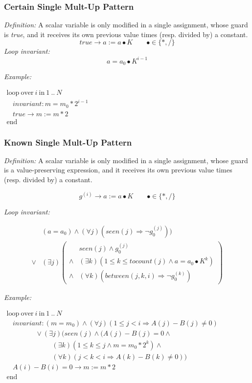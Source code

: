 \documentclass[a4paper,10pt]{article}
\newcommand{\idx}{\ensuremath{i}\xspace}
\newcommand{\at}[1]{{(#1)}}
\newcommand{\KWloop}{\ensuremath{\mathrm{loop}~}}
\newcommand{\KWend}{\ensuremath{\mathrm{end}~}}
\newcommand{\KWover}{\ensuremath{\mathrm{over}~}}
\newcommand{\KWin}{\ensuremath{~\mathrm{in}~}}
\newcommand{\impl}{\ensuremath{\Longrightarrow}}
\newcommand{\seen}[1]{\ensuremath{\mathit{seen}(#1)}\xspace}
\newcommand{\tocount}[1]{\ensuremath{\mathit{tocount}(#1)}\xspace}
\newcommand{\between}[3]{\ensuremath{\mathit{between}{(#1,#2,#3)}}\xspace}
\newcommand{\loopinvariant}{\noindent\textit{Loop invariant:}\xspace}
\newcommand{\patterndef}{\noindent\textit{Definition:}\xspace}
\newcommand{\patternexample}{\noindent\textit{Example:}\xspace}
\begin{document}
\subsubsection*{Certain Single Mult-Up Pattern}

\patterndef A scalar variable is only modified in a single assignment, whose
guard is \textit{true}, and it receives its own previous value times
(resp. divided by) a constant.
%
$$\mathit{true} \rightarrow a := a \bullet K \qquad \bullet \in \{*, / \}$$
%
\loopinvariant
%
$$a = a_0 \bullet K^{i-1}$$

\bigskip
\patternexample

\medskip
$\begin{array}{l}
  \KWloop \KWover i \KWin 1~..~N \\
  ~~~~ \textit{invariant}: m = m_0 * 2^{i-1}\\
  ~~~~ true \rightarrow m := m*2\\
  \KWend
\end{array}$

\subsubsection*{Known Single Mult-Up Pattern}

\patterndef A scalar variable is only modified in a single assignment, whose
guard is a value-preserving expression, and it receives its own previous value times
(resp. divided by) a constant.

$$g^\at{\idx} \rightarrow a := a \bullet K  \qquad \bullet \in \{*, / \}$$

\loopinvariant

\begin{eqnarray*}
&(a = a_0) \land (\forall j)(\seen{j} \impl \neg g_0^\at{j})) \\
\lor 
& (\exists j)
\left(\begin{array}{cl}
& \seen{j} \land g_0^\at{j} \\
\land& (\exists k)(1 \leq k \leq \tocount{j} \land a = a_0 \bullet K^k)\\
\land& (\forall k)(\between{j}{k}{\idx} \impl \neg g_0^\at{k})
\end{array}\right)
\end{eqnarray*}

\bigskip
\patternexample

\medskip
$\begin{array}{l}
  \KWloop \KWover i \KWin 1~..~N \\
  ~~~~ \textit{invariant}: (m = m_0) \land (\forall j)(1 \leq j < i \impl A(j)-B(j)\neq0)\\
  ~~~~~~~~~~~~~~~~~~~ \lor (\exists j)(\seen{j} \land (A(j)-B(j)= 0 \land \\
  ~~~~~~~~~~~~~~~~~~~~~~~~~~~~~~ (\exists k)(1 \leq k \leq j \land m = m_0 * 2^k) \land\\
  ~~~~~~~~~~~~~~~~~~~~~~~~~~~~~~ (\forall k)(j < k < i \impl A(k)-B(k)\neq0))\\
  ~~~~ A(i)-B(i)=0 \rightarrow m := m*2\\
  \KWend
\end{array}$
\end{document}
